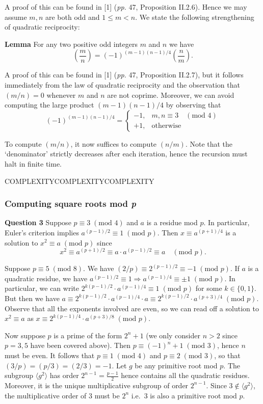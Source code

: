 \documentclass[12pt]{article}
\newcommand{\textmod}[1]{\;(\text{mod }#1)}
\newcommand{\mathmod}[1]{\quad(\text{mod }#1)}
\begin{document}
A proof of this can be found in [1] (\textit{pp.} 47, Proposition
II.2.6). Hence we may assume \(m,n\) are both odd and \(1\leq m<n\). We state the following strengthening of quadratic reciprocity: 

\textbf{Lemma} For any two positive odd integers \(m\) and \(n\) we have
\[\left(\frac{m}{n}\right) = (-1)^{(m-1)(n-1)/4}\left(\frac{n}{m}\right).\]

A proof of this can be found in [1] (\textit{pp.} 47, Proposition
II.2.7), but it follows immediately from the law of quadratic reciprocity and
the observation that \((m/n)=0\) whenever \(m\) and \(n\) are not coprime.
Moreover, we can avoid computing the large product \((m-1)(n-1)/4\) by observing
that 
\[(-1)^{(m-1)(n-1)/4} = \begin{cases}
    -1, & m,n\equiv 3 \quad(\text{mod }4) \\
    +1, &\text{otherwise}
\end{cases}\] 

To compute \((m/n)\), it now suffices to compute \((n/m)\). Note that the
`denominator' strictly decreases after each iteration, hence the recursion must
halt in finite time.

COMPLEXITYCOMPLEXITYCOMPLEXITY

\subsubsection{Computing square roots mod \textit{p}}
\textbf{Question 3}\quad 
Suppose \(p\equiv 3\;(\text{mod }4)\) and \(a\) is a residue mod \(p\). In
particular, Euler's criterion implies \(a^{(p-1)/2}\equiv 1\textmod{p}\). Then \(x\equiv
a^{(p+1)/4}\) is a solution to \(x^2\equiv a\textmod{p}\) since
\[x^2 \equiv a^{(p+1)/2} \equiv a\cdot a^{(p-1)/2} \equiv a \mathmod{p}.\]

Suppose \(p\equiv 5\textmod{8}\). We have \((2/p) \equiv
2^{(p-1)/2}\equiv -1 \textmod{p}\). If \(a\) is a quadratic residue, we have
\(a^{(p-1)/2}\equiv 1 \Rightarrow a^{(p-1)/4}\equiv \pm 1 \textmod{p}\). In
particular, we can write \( 2^{k(p-1)/2} \cdot a^{(p-1)/4}\equiv 1 \textmod{p}\) for some \(k\in
\{0,1\}\). But then we have \(a \equiv 2^{k(p-1)/2} \cdot a^{(p-1)/4}\cdot a \equiv
2^{k(p-1)/2}\cdot a^{(p+3)/4} \textmod{p}\). Observe that all the exponents
involved are even, so we can read off a solution to \(x^2\equiv a\) as \(x\equiv
2^{k(p-1)/4}\cdot a^{(p+3)/8}\textmod{p}\).

\hfill 

Now suppose \(p\) is a prime of the form \(2^n+1\) (we only consider \(n>2\)
since \(p=3,5\) have been covered above). Then \(p\equiv (-1)^n+1\textmod{3}\),
hence \(n\) must be even. It follows that \(p\equiv 1\textmod{4}\) and \(p\equiv
2\textmod{3}\), so that \((3/p) = (p/3) = (2/3) = -1\). Let \(g\) be any
primitive root mod \(p\). The subgroup \(\langle g^2\rangle\) has order
\(2^{n-1}=\frac{p-1}{2}\) hence contains all the quadratic residues. Moreover,
it is the unique multiplicative subgroup of order \(2^{n-1}\). Since \(3\notin
\langle g^2\rangle\), the multiplicative order of \(3\) must be \(2^n\) i.e.\
\(3\) is also a primitive root mod \(p\). 
\end{document}
